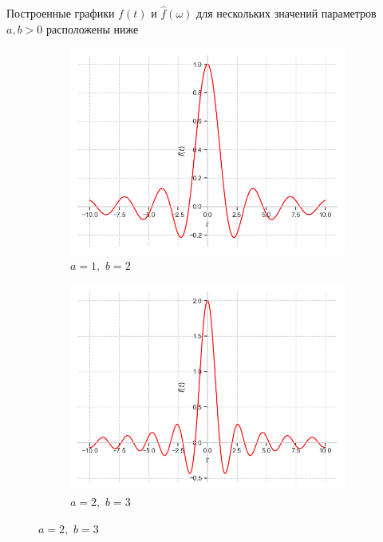\documentclass[a4paper, 16pt]{article}
\begin{document}
    \noindent Построенные графики $f(t)$ и $\hat{f}\left(\omega\right)$ для нескольких значений параметров $a,b>0$ расположены ниже
    \begin{figure}[htbp]
        \centering
        \begin{subfigure}{0.3\textwidth}
            \centering
            \includegraphics[width=\linewidth]{sinc_a=1_b=2.png}
            \caption{$a=1,\,\,b=2$}
            \label{fig:sinc_1}
        \end{subfigure}
        \hfill
        \begin{subfigure}{0.3\textwidth}
            \centering
            \includegraphics[width=\linewidth]{sinc_a=2_b=3.png}
            \caption{$a=2,\,\,b=3$}

\end{subfigure}
\end{figure}
\end{document}
